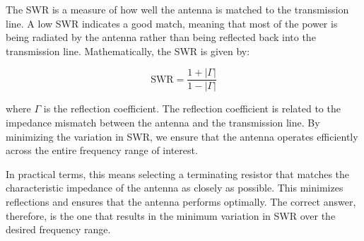 The SWR is a measure of how well the antenna is matched to the transmission line. A low SWR indicates a good match, meaning that most of the power is being radiated by the antenna rather than being reflected back into the transmission line. Mathematically, the SWR is given by:

\[
\text{SWR} = \frac{1 + |\Gamma|}{1 - |\Gamma|}
\]

where \(\Gamma\) is the reflection coefficient. The reflection coefficient is related to the impedance mismatch between the antenna and the transmission line. By minimizing the variation in SWR, we ensure that the antenna operates efficiently across the entire frequency range of interest.

In practical terms, this means selecting a terminating resistor that matches the characteristic impedance of the antenna as closely as possible. This minimizes reflections and ensures that the antenna performs optimally. The correct answer, therefore, is the one that results in the minimum variation in SWR over the desired frequency range.

